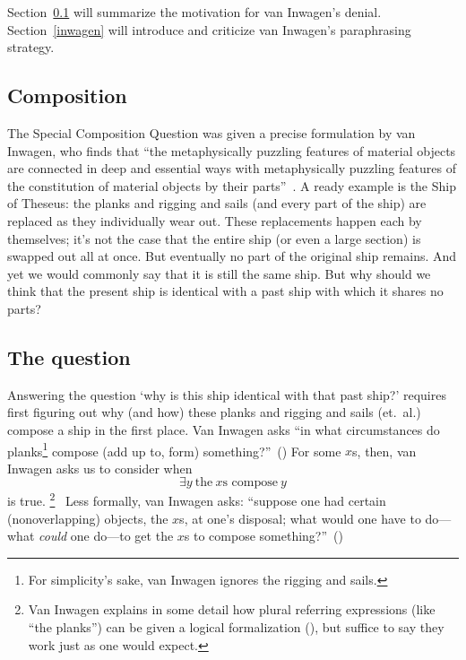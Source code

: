 \documentclass[11pt]{standalone}
\begin{document}
\begin{spacing}{1.5}
Section~\ref{comp} will summarize the motivation for van Inwagen's
denial.  Section~\ref{inwagen} will introduce and criticize van
Inwagen's paraphrasing strategy.

\subsection{Composition}
\label{comp}
The Special Composition Question was given a precise formulation by
van Inwagen, who finds that ``the metaphysically puzzling features of
material objects are connected in deep and essential ways with
metaphysically puzzling features of the constitution of material
objects by their parts''~\citep[18]{inwagen1995}.  A ready example is
the Ship of Theseus: the planks and rigging and sails (and every part
of the ship) are replaced as they individually wear out.  These
replacements happen each by themselves; it's not the case that the
entire ship (or even a large section) is swapped out all at once.  But
eventually no part of the original ship remains.  And yet we would
commonly say that it is still the same ship.  But why should we think
that the present ship is identical with a past ship with which it
shares no parts?

\subsection{The question}
\label{scq}
Answering the question `why is this ship identical with that past
ship?' requires first figuring out why (and how) these planks and
rigging and sails (et.\ al.) compose a ship in the first place.  Van
Inwagen asks ``in what circumstances do planks\footnote{For
  simplicity's sake, van Inwagen ignores the rigging and sails.}
compose (add up to, form) something?''~(\citeyear[21]{inwagen1995}) 
For some $x$s, then, van Inwagen asks us to consider when
\begin{equation}
\exists y\ \text{the}\ x\text{s compose}\ y
\end{equation}
is true.%
\footnote{Van Inwagen explains in some detail how plural referring
  expressions (like ``the planks'') can be given a logical
  formalization (\citeyear[23--28]{inwagen1995}), but suffice to say
  they work just as one would expect.}
%
\ Less formally, van Inwagen asks: ``suppose one had certain
(nonoverlapping) objects, the $x$s, at one's disposal; what would one
have to do---what {\em could} one do---to get the $x$s to compose
something?''~(\citeyear[31]{inwagen1995})


\end{spacing}
\end{document}
